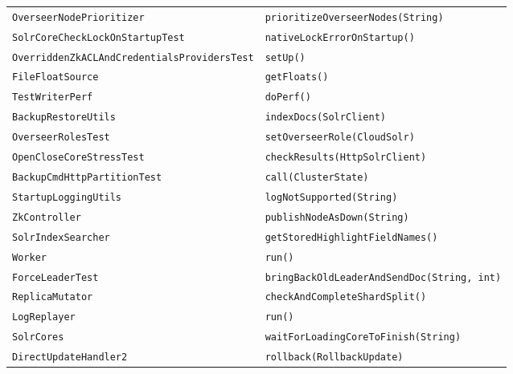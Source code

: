 \begin{center}
\begin{longtable}{ll}
\lstinline/OverseerNodePrioritizer/&{\lstinline/prioritizeOverseerNodes(String)/}\\
\lstinline/SolrCoreCheckLockOnStartupTest/&{\lstinline/nativeLockErrorOnStartup()/}\\
\lstinline/OverriddenZkACLAndCredentialsProvidersTest/&{\lstinline/setUp()/}\\
\lstinline/FileFloatSource/&{\lstinline/getFloats()/}\\
\lstinline/TestWriterPerf/&{\lstinline/doPerf()/}\\
\lstinline/BackupRestoreUtils/&{\lstinline/indexDocs(SolrClient)/}\\
\lstinline/OverseerRolesTest/&{\lstinline/setOverseerRole(CloudSolr)/}\\
\lstinline/OpenCloseCoreStressTest/&{\lstinline/checkResults(HttpSolrClient)/}\\
\lstinline/BackupCmdHttpPartitionTest/&{\lstinline/call(ClusterState)/}\\
\lstinline/StartupLoggingUtils/&{\lstinline/logNotSupported(String)/}\\
\lstinline/ZkController/&{\lstinline/publishNodeAsDown(String)/}\\
\lstinline/SolrIndexSearcher/&{\lstinline/getStoredHighlightFieldNames()/}\\
\lstinline/Worker/&{\lstinline/run()/}\\
\lstinline/ForceLeaderTest/&{\lstinline/bringBackOldLeaderAndSendDoc(String, int)/}\\
\lstinline/ReplicaMutator/&{\lstinline/checkAndCompleteShardSplit()/}\\
\lstinline/LogReplayer/&{\lstinline/run()/}\\
\lstinline/SolrCores/&{\lstinline/waitForLoadingCoreToFinish(String)/}\\
\lstinline/DirectUpdateHandler2/&{\lstinline/rollback(RollbackUpdate)/}\\
\end{longtable}
\end{center}

